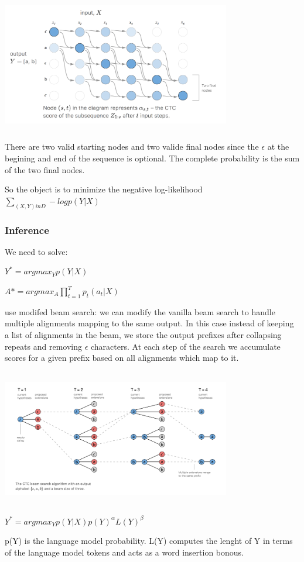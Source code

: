 \documentclass[a4paper]{article}
\begin{document}
\begin{center}
\includegraphics[width=10cm, height=6cm]{dp_g.png}
\end{center}

There are two valid starting nodes and two valide final nodes since the $\epsilon$ at the begining and end of the sequence is optional. The complete probability is the sum of the two final nodes.

So the object is to minimize the negative log-likelihood
$\sum_{(X,Y) in D} - log p(Y|X)$

\subsubsection{Inference}

We need to solve:

$Y^* = argmax_Y p(Y|X)$

$A* = argmax_A \prod_{t=1}^T p_t(a_t|X)$

use modifed beam search:
we can modify the vanilla beam search to handle multiple alignments mapping to the same output. In this case instead of keeping a list of alignments in the beam, we store the output prefixes after collapsing repeats and removing $\epsilon$ characters. At each step of the search we accumulate scores for a given prefix based on all alignments which map to it.

\begin{center}
\includegraphics[width=10cm, height=6cm]{bs.png}
\end{center}

$Y^*= argmax_Y p(Y|X)p(Y)^{\alpha}L(Y)^{\beta}$

p(Y) is the language model probability. L(Y) computes the lenght of Y in terms of the language model tokens and acts as a word insertion bonous.

\end{document}
